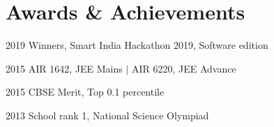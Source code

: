 \documentclass[letterpaper,11pt]{article}
\newcommand{\resumeSubHeadingListStart}{\begin{itemize}[leftmargin=0.15in, label={}]}
\newcommand{\resumeSubHeadingListEnd}{\end{itemize}}
\begin{document}
\section{Awards \& Achievements}
\vspace{2pt}
\resumeSubHeadingListStart
\small{\item{
	2019 \hspace{10pt} Winners, Smart India Hackathon 2019, Software edition
	\\ \vspace{3pt}
	
	2015 \hspace{10pt} AIR 1642, JEE Mains $|$ AIR 6220, JEE Advance
	\\ \vspace{3pt}
	
	2015 \hspace{10pt} CBSE Merit, Top 0.1 percentile
	\\ \vspace{3pt}
	
	2013 \hspace{10pt} School rank 1, National Science Olympiad
	\\ \vspace{3pt}
	        
}}
\resumeSubHeadingListEnd


\end{document}
